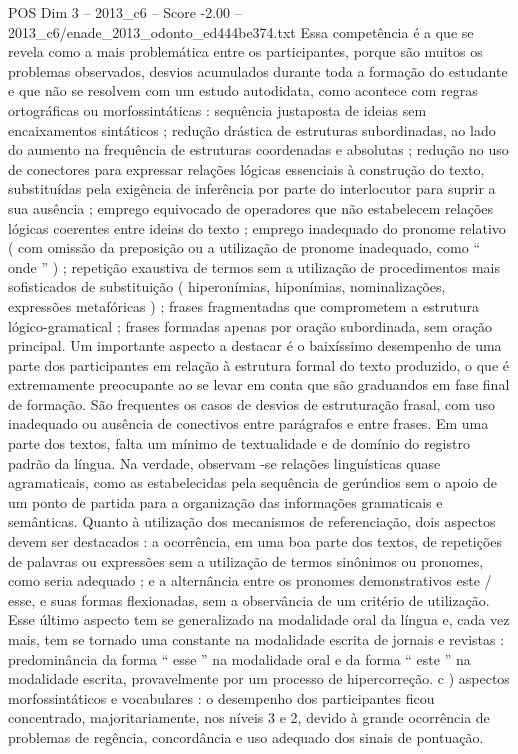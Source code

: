 \begin{textsample}{POS Dim 3 – 2013\_c6 – Score -2.00 – 2013\_c6/enade\_2013\_odonto\_ed444be374.txt}
Essa competência é a que se revela como a mais problemática entre os participantes, porque são muitos os problemas observados, desvios acumulados durante toda a formação do estudante e que não se resolvem com um estudo autodidata, como acontece com regras ortográficas ou morfossintáticas : sequência justaposta de ideias sem encaixamentos sintáticos ; redução drástica de estruturas subordinadas, ao lado do aumento na frequência de estruturas coordenadas e absolutas ; redução no uso de conectores para expressar relações lógicas essenciais à construção do texto, substituídas pela exigência de inferência por parte do interlocutor para suprir a sua ausência ; emprego equivocado de operadores que não estabelecem relações lógicas coerentes entre ideias do texto ; emprego inadequado do pronome relativo ( com omissão da preposição ou a utilização de pronome inadequado, como “ onde ” ) ; repetição exaustiva de termos sem a utilização de procedimentos mais sofisticados de substituição ( hiperonímias, hiponímias, nominalizações, expressões metafóricas ) ; frases fragmentadas que comprometem a estrutura lógico-gramatical ; frases formadas apenas por oração subordinada, sem oração principal.
Um importante aspecto a destacar é o baixíssimo desempenho de uma parte dos participantes em relação à estrutura formal do texto produzido, o que é extremamente preocupante ao se levar em conta que são graduandos em fase final de formação.
São frequentes os casos de desvios de estruturação frasal, com uso inadequado ou ausência de conectivos entre parágrafos e entre frases.
Em uma parte dos textos, falta um mínimo de textualidade e de domínio do registro padrão da língua.
Na verdade, observam -se relações linguísticas quase agramaticais, como as estabelecidas pela sequência de gerúndios sem o apoio de um ponto de partida para a organização das informações gramaticais e semânticas.
Quanto à utilização dos mecanismos de referenciação, dois aspectos devem ser destacados : a ocorrência, em uma boa parte dos textos, de repetições de palavras ou expressões sem a utilização de termos sinônimos ou pronomes, como seria adequado ; e a alternância entre os pronomes demonstrativos este / esse, e suas formas flexionadas, sem a observância de um critério de utilização.
Esse último aspecto tem se generalizado na modalidade oral da língua e, cada vez mais, tem se tornado uma constante na modalidade escrita de jornais e revistas : predominância da forma “ esse ” na modalidade oral e da forma “ este ” na modalidade escrita, provavelmente por um processo de hipercorreção. c ) aspectos morfossintáticos e vocabulares : o desempenho dos participantes ficou concentrado, majoritariamente, nos níveis 3 e 2, devido à grande ocorrência de problemas de regência, concordância e uso adequado dos sinais de pontuação.

\end{textsample}
